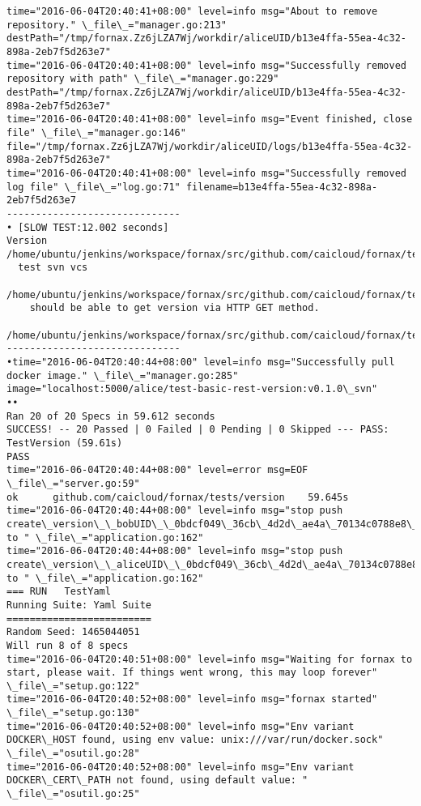 \begin{lstlisting}[caption={Fornax功能性测试日志}]
time="2016-06-04T20:40:41+08:00" level=info msg="About to remove repository." \_file\_="manager.go:213" destPath="/tmp/fornax.Zz6jLZA7Wj/workdir/aliceUID/b13e4ffa-55ea-4c32-898a-2eb7f5d263e7" 
time="2016-06-04T20:40:41+08:00" level=info msg="Successfully removed repository with path" \_file\_="manager.go:229" destPath="/tmp/fornax.Zz6jLZA7Wj/workdir/aliceUID/b13e4ffa-55ea-4c32-898a-2eb7f5d263e7" 
time="2016-06-04T20:40:41+08:00" level=info msg="Event finished, close file" \_file\_="manager.go:146" file="/tmp/fornax.Zz6jLZA7Wj/workdir/aliceUID/logs/b13e4ffa-55ea-4c32-898a-2eb7f5d263e7" 
time="2016-06-04T20:40:41+08:00" level=info msg="Successfully removed log file" \_file\_="log.go:71" filename=b13e4ffa-55ea-4c32-898a-2eb7f5d263e7 
------------------------------
• [SLOW TEST:12.002 seconds]
Version
/home/ubuntu/jenkins/workspace/fornax/src/github.com/caicloud/fornax/tests/version/version\_test.go:374
  test svn vcs
  /home/ubuntu/jenkins/workspace/fornax/src/github.com/caicloud/fornax/tests/version/version\_test.go:373
    should be able to get version via HTTP GET method.
    /home/ubuntu/jenkins/workspace/fornax/src/github.com/caicloud/fornax/tests/version/version\_test.go:349
------------------------------
•time="2016-06-04T20:40:44+08:00" level=info msg="Successfully pull docker image." \_file\_="manager.go:285" image="localhost:5000/alice/test-basic-rest-version:v0.1.0\_svn" 
••
Ran 20 of 20 Specs in 59.612 seconds
SUCCESS! -- 20 Passed | 0 Failed | 0 Pending | 0 Skipped --- PASS: TestVersion (59.61s)
PASS
time="2016-06-04T20:40:44+08:00" level=error msg=EOF \_file\_="server.go:59" 
ok  	github.com/caicloud/fornax/tests/version	59.645s
time="2016-06-04T20:40:44+08:00" level=info msg="stop push create\_version\_\_bobUID\_\_0bdcf049\_36cb\_4d2d\_ae4a\_70134c0788e8\_\_4d1ddff9\_e571\_49ce\_bb68\_afbf94c5e4b1 to " \_file\_="application.go:162" 
time="2016-06-04T20:40:44+08:00" level=info msg="stop push create\_version\_\_aliceUID\_\_0bdcf049\_36cb\_4d2d\_ae4a\_70134c0788e8\_\_\_1 to " \_file\_="application.go:162" 
=== RUN   TestYaml
Running Suite: Yaml Suite
=========================
Random Seed: 1465044051
Will run 8 of 8 specs
time="2016-06-04T20:40:51+08:00" level=info msg="Waiting for fornax to start, please wait. If things went wrong, this may loop forever" \_file\_="setup.go:122" 
time="2016-06-04T20:40:52+08:00" level=info msg="fornax started" \_file\_="setup.go:130" 
time="2016-06-04T20:40:52+08:00" level=info msg="Env variant DOCKER\_HOST found, using env value: unix:///var/run/docker.sock" \_file\_="osutil.go:28" 
time="2016-06-04T20:40:52+08:00" level=info msg="Env variant DOCKER\_CERT\_PATH not found, using default value: " \_file\_="osutil.go:25" 

\end{lstlisting}
